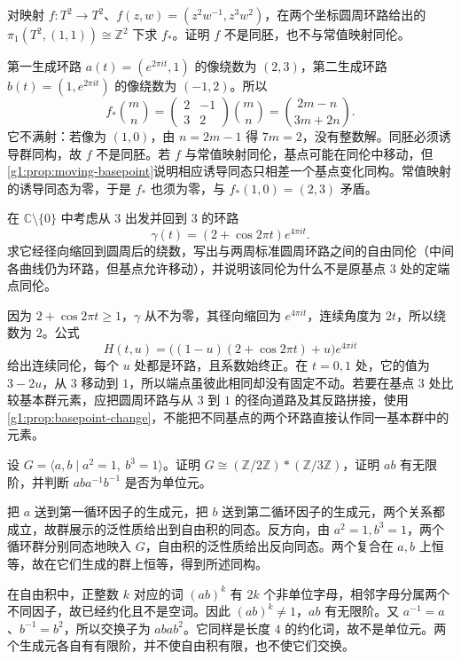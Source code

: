 \begin{exercise}\label{g1:ex:torus-induced-matrix}
	对映射 \(f:T^2\rightarrow T^2\)、\(f(z,w)=(z^2w^{-1},z^3w^2)\)，在两个坐标圆周环路给出的 \(\pi_1(T^2,(1,1))\cong\mathbb Z^2\) 下求 \(f_*\)。证明 \(f\) 不是同胚，也不与常值映射同伦。
\end{exercise}
\begin{solution}
	第一生成环路 \(a(t)=(e^{2\pi it},1)\) 的像绕数为 \((2,3)\)，第二生成环路 \(b(t)=(1,e^{2\pi it})\) 的像绕数为 \((-1,2)\)。所以
	\[
		f_*\binom{m}{n}
		=\begin{pmatrix}2&-1\\3&2\end{pmatrix}\binom{m}{n}
		=\binom{2m-n}{3m+2n}.
	\]
	它不满射：若像为 \((1,0)\)，由 \(n=2m-1\) 得 \(7m=2\)，没有整数解。同胚必须诱导群同构，故 \(f\) 不是同胚。若 \(f\) 与常值映射同伦，基点可能在同伦中移动，但\cref{g1:prop:moving-basepoint}说明相应诱导同态只相差一个基点变化同构。常值映射的诱导同态为零，于是 \(f_*\) 也须为零，与 \(f_*(1,0)=(2,3)\) 矛盾。
\end{solution}

\begin{exercise}\label{g1:ex:radial-winding}
	在 \(\mathbb C\setminus\{0\}\) 中考虑从 \(3\) 出发并回到 \(3\) 的环路
	\[
		\gamma(t)=(2+\cos2\pi t)e^{4\pi it}.
	\]
	求它经径向缩回到圆周后的绕数，写出与两周标准圆周环路之间的自由同伦（中间各曲线仍为环路，但基点允许移动），并说明该同伦为什么不是原基点 \(3\) 处的定端点同伦。
\end{exercise}
\begin{solution}
	因为 \(2+\cos2\pi t\ge1\)，\(\gamma\) 从不为零，其径向缩回为 \(e^{4\pi it}\)，连续角度为 \(2t\)，所以绕数为 \(2\)。公式
	\[
		H(t,u)=\bigl((1-u)(2+\cos2\pi t)+u\bigr)e^{4\pi it}
	\]
	给出连续同伦，每个 \(u\) 处都是环路，且系数始终正。在 \(t=0,1\) 处，它的值为 \(3-2u\)，从 \(3\) 移动到 \(1\)，所以端点虽彼此相同却没有固定不动。若要在基点 \(3\) 处比较基本群元素，应把圆周环路与从 \(3\) 到 \(1\) 的径向道路及其反路拼接，使用\cref{g1:prop:basepoint-change}，不能把不同基点的两个环路直接认作同一基本群中的元素。
\end{solution}

\begin{exercise}\label{g1:ex:free-product-orders}
	设 \(G=\langle a,b\mid a^2=1,\ b^3=1\rangle\)。证明 \(G\cong(\mathbb Z/2\mathbb Z)*(\mathbb Z/3\mathbb Z)\)，证明 \(ab\) 有无限阶，并判断 \(aba^{-1}b^{-1}\) 是否为单位元。
\end{exercise}
\begin{solution}
	把 \(a\) 送到第一循环因子的生成元，把 \(b\) 送到第二循环因子的生成元，两个关系都成立，故群展示的泛性质给出到自由积的同态。反方向，由 \(a^2=1,b^3=1\)，两个循环群分别同态地映入 \(G\)，自由积的泛性质给出反向同态。两个复合在 \(a,b\) 上恒等，故在它们生成的群上恒等，得到所述同构。

	在自由积中，正整数 \(k\) 对应的词 \((ab)^k\) 有 \(2k\) 个非单位字母，相邻字母分属两个不同因子，故已经约化且不是空词。因此 \((ab)^k\ne1\)，\(ab\) 有无限阶。又 \(a^{-1}=a\)、\(b^{-1}=b^2\)，所以交换子为 \(abab^2\)。它同样是长度 \(4\) 的约化词，故不是单位元。两个生成元各自有有限阶，并不使自由积有限，也不使它们交换。
\end{solution}

